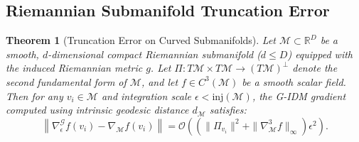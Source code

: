 \documentclass[11pt,a4paper]{article}
\newtheorem{theorem}{Theorem}
\theoremstyle{definition}
\begin{document}
\subsection{Riemannian Submanifold Truncation Error}

\begin{theorem}[Truncation Error on Curved Submanifolds]
\label{thm:submanifold_error}
Let $\mathcal{M} \subset \mathbb{R}^D$ be a smooth, $d$-dimensional compact Riemannian submanifold ($d \le D$) equipped with the induced Riemannian metric $g$. 
Let $\Pi: T\mathcal{M} \times T\mathcal{M} \to (T\mathcal{M})^\perp$ denote the second fundamental form of $\mathcal{M}$, and let $f \in C^3(\mathcal{M})$ be a smooth scalar field.
Then for any $v_i \in \mathcal{M}$ and integration scale $\epsilon < \text{inj}(\mathcal{M})$, the G-IDM gradient computed using intrinsic geodesic distance $d_{\mathcal{M}}$ satisfies:
\begin{equation}
\left\| \nabla_\epsilon^{\mathcal{G}} f(v_i) - \nabla_{\mathcal{M}} f(v_i) \right\| = \mathcal{O}\left( \left( \|\Pi_{v_i}\|^2 + \|\nabla_{\mathcal{M}}^3 f\|_\infty \right) \epsilon^2 \right).
\end{equation}
\end{theorem}
\end{document}
